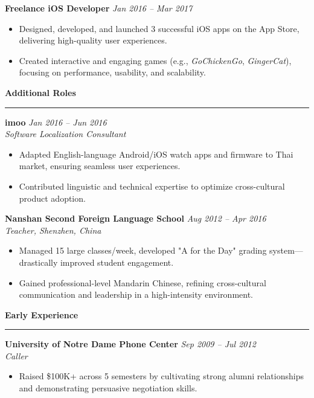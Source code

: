 \documentclass[letterpaper,10pt]{article}
\newcommand{\resheading}[1]{
  \vspace{10pt}
  \textbf{\large #1}
  \vspace{5pt}
  \hrule
  \vspace{5pt}
}
\begin{document}
\textbf{Freelance iOS Developer} \hfill \textit{Jan 2016 -- Mar 2017}\\
\begin{itemize}
  \item Designed, developed, and launched 3 successful iOS apps on the App Store, 
        delivering high-quality user experiences.
  \item Created interactive and engaging games (e.g., \emph{GoChickenGo}, \emph{GingerCat}), 
        focusing on performance, usability, and scalability.
\end{itemize}

\resheading{Additional Roles}
\textbf{imoo} \hfill \textit{Jan 2016 -- Jun 2016}\\
\emph{Software Localization Consultant}\\
\begin{itemize}
  \item Adapted English-language Android/iOS watch apps and firmware to Thai market, 
        ensuring seamless user experiences.
  \item Contributed linguistic and technical expertise to optimize 
        cross-cultural product adoption.
\end{itemize}

\textbf{Nanshan Second Foreign Language School} \hfill \textit{Aug 2012 -- Apr 2016}\\
\emph{Teacher, Shenzhen, China}\\
\begin{itemize}
  \item Managed 15 large classes/week, developed "A for the Day" grading 
        system—drastically improved student engagement.
  \item Gained professional-level Mandarin Chinese, refining cross-cultural 
        communication and leadership in a high-intensity environment.
\end{itemize}

\resheading{Early Experience}
\textbf{University of Notre Dame Phone Center} \hfill \textit{Sep 2009 -- Jul 2012}\\
\emph{Caller}\\
\begin{itemize}
  \item Raised \$100K+ across 5 semesters by cultivating strong alumni 
        relationships and demonstrating persuasive negotiation skills.
\end{itemize}
\end{document}

